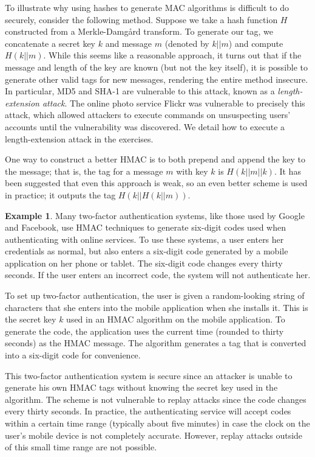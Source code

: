 \documentclass{book}
\theoremstyle{plain}
\theoremstyle{definition}
\newtheorem{example}[theorem]{Example}
\begin{document}
To illustrate why using hashes to generate MAC algorithms is difficult to do securely, consider the following method. Suppose we take a hash function $H$ constructed from a Merkle-Damg\r{a}rd transform. To generate our tag, we concatenate a secret key $k$ and message $m$ (denoted by $k||m$) and compute $H(k||m)$. While this seems like a reasonable approach, it turns out that if the message and length of the key are known (but not the key itself), it is possible to generate other valid tags for new messages, rendering the entire method insecure. In particular, MD5 and SHA-1 are vulnerable to this attack, known as a {\it length-extension attack}. The online photo service Flickr was vulnerable to precisely this attack, which allowed attackers to execute commands on unsuspecting users' accounts until the vulnerability was discovered. We detail how to execute a length-extension attack in the exercises.

One way to construct a better HMAC is to both prepend and append the key to the message; that is, the tag for a message $m$ with key $k$ is $H(k||m||k)$. It has been suggested that even this approach is weak, so an even better scheme is used in practice; it outputs the tag $H(k||H(k||m))$.

\begin{example}
Many two-factor authentication systems, like those used by Google and Facebook, use HMAC techniques to generate six-digit codes used when authenticating with online services. To use these systems, a user enters her credentials as normal, but also enters a six-digit code generated by a mobile application on her phone or tablet. The six-digit code changes every thirty seconds. If the user enters an incorrect code, the system will not authenticate her.

To set up two-factor authentication, the user is given a random-looking string of characters that she enters into the mobile application when she installs it. This is the secret key $k$ used in an HMAC algorithm on the mobile application. To generate the code, the application uses the current time (rounded to thirty seconds) as the HMAC message. The algorithm generates a tag that is converted into a six-digit code for convenience.

This two-factor authentication system is secure since an attacker is unable to generate his own HMAC tags without knowing the secret key used in the algorithm. The scheme is not vulnerable to replay attacks since the code changes every thirty seconds. In practice, the authenticating service will accept codes within a certain time range (typically about five minutes) in case the clock on the user's mobile device is not completely accurate. However, replay attacks outside of this small time range are not possible.
\end{example}
\end{document}

